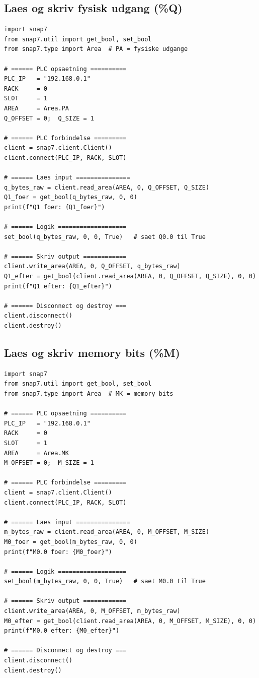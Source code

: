 \documentclass[12pt, a4paper]{article}
\begin{document}
\subsection{Laes og skriv fysisk udgang (\%Q)}

\begin{tcolorbox}[pythonbox, title={\faPython\quad Kode 3 --- Skriv til fysisk udgang \%Q0.0}]
\begin{verbatim}
import snap7
from snap7.util import get_bool, set_bool
from snap7.type import Area  # PA = fysiske udgange

# ====== PLC opsaetning ==========
PLC_IP   = "192.168.0.1"
RACK     = 0
SLOT     = 1
AREA     = Area.PA
Q_OFFSET = 0;  Q_SIZE = 1

# ====== PLC forbindelse =========
client = snap7.client.Client()
client.connect(PLC_IP, RACK, SLOT)

# ====== Laes input ===============
q_bytes_raw = client.read_area(AREA, 0, Q_OFFSET, Q_SIZE)
Q1_foer = get_bool(q_bytes_raw, 0, 0)
print(f"Q1 foer: {Q1_foer}")

# ====== Logik ===================
set_bool(q_bytes_raw, 0, 0, True)   # saet Q0.0 til True

# ====== Skriv output ============
client.write_area(AREA, 0, Q_OFFSET, q_bytes_raw)
Q1_efter = get_bool(client.read_area(AREA, 0, Q_OFFSET, Q_SIZE), 0, 0)
print(f"Q1 efter: {Q1_efter}")

# ====== Disconnect og destroy ===
client.disconnect()
client.destroy()
\end{verbatim}
\end{tcolorbox}

\subsection{Laes og skriv memory bits (\%M)}

\begin{tcolorbox}[pythonbox, title={\faPython\quad Kode 4 --- Laes og skriv memory bit \%M0.0}]
\begin{verbatim}
import snap7
from snap7.util import get_bool, set_bool
from snap7.type import Area  # MK = memory bits

# ====== PLC opsaetning ==========
PLC_IP   = "192.168.0.1"
RACK     = 0
SLOT     = 1
AREA     = Area.MK
M_OFFSET = 0;  M_SIZE = 1

# ====== PLC forbindelse =========
client = snap7.client.Client()
client.connect(PLC_IP, RACK, SLOT)

# ====== Laes input ===============
m_bytes_raw = client.read_area(AREA, 0, M_OFFSET, M_SIZE)
M0_foer = get_bool(m_bytes_raw, 0, 0)
print(f"M0.0 foer: {M0_foer}")

# ====== Logik ===================
set_bool(m_bytes_raw, 0, 0, True)   # saet M0.0 til True

# ====== Skriv output ============
client.write_area(AREA, 0, M_OFFSET, m_bytes_raw)
M0_efter = get_bool(client.read_area(AREA, 0, M_OFFSET, M_SIZE), 0, 0)
print(f"M0.0 efter: {M0_efter}")

# ====== Disconnect og destroy ===
client.disconnect()
client.destroy()
\end{verbatim}
\end{tcolorbox}
\end{document}
